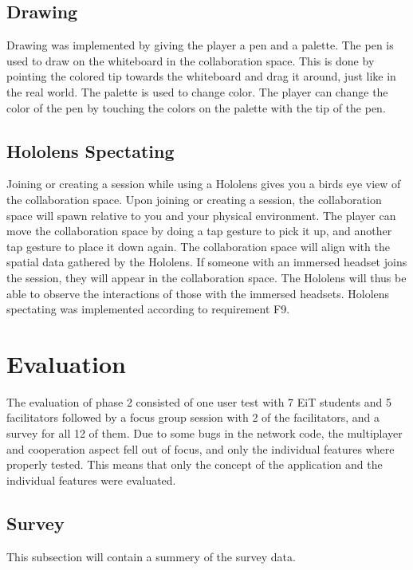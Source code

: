         \subsection{Drawing}
        Drawing was implemented by giving the player a pen and a palette. The pen is used to draw on the whiteboard in the collaboration space. This is done by pointing the colored tip towards the whiteboard and drag it around, just like in the real world. The palette is used to change color. The player can change the color of the pen by touching the colors on the palette with the tip of the pen.  %
        
        \subsection{Hololens Spectating}
        Joining or creating a session while using a Hololens gives you a birds eye view of the collaboration space. Upon joining or creating a session, the collaboration space will spawn relative to you and your physical environment. The player can move the collaboration space by doing a tap gesture to pick it up, and another tap gesture to place it down again. The collaboration space will align with the spatial data gathered by the Hololens. If someone with an immersed headset joins the session, they will appear in the collaboration space. The Hololens will thus be able to observe the interactions of those with the immersed headsets. Hololens spectating was implemented according to requirement F9.
    
    \section{Evaluation}
    The evaluation of phase 2 consisted of one user test with 7 EiT students and 5 facilitators followed by a focus group session with 2 of the facilitators, and a survey for all 12 of them.
    Due to some bugs in the network code, the multiplayer and cooperation aspect fell out of focus, and only the individual features where properly tested. This means that only the concept of the application and the individual features were evaluated.
    
    
        \subsection{Survey} %
        This subsection will contain a summery of the survey data.
        
